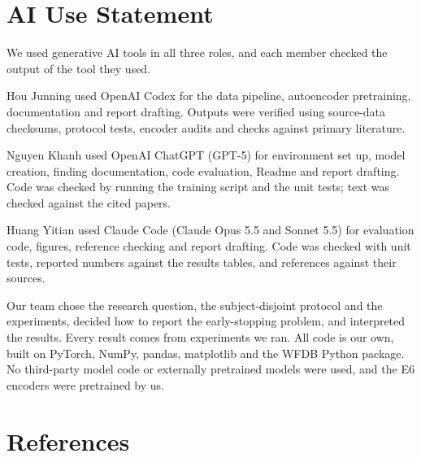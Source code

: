 \documentclass[10pt,a4paper]{article}
\begin{document}
\par\noindent\begin{minipage}{\linewidth}
\setlength{\parskip}{4pt}
\section*{AI Use Statement}

We used generative AI tools in all three roles, and each member checked the output of the tool they used.

Hou Junning used OpenAI Codex for the data pipeline, autoencoder pretraining, documentation and report drafting. Outputs were verified using source-data checksums, protocol tests, encoder audits and checks against primary literature.

Nguyen Khanh used OpenAI ChatGPT (GPT-5) for environment set up, model creation, finding documentation, code evaluation, Readme and report drafting. Code was checked by running the training script and the unit tests; text was checked against the cited papers. 

Huang Yitian used Claude Code (Claude Opus 5.5 and Sonnet 5.5) for evaluation code, figures, reference checking and report drafting. Code was checked with unit tests, reported numbers against the results tables, and references against their sources.

Our team chose the research question, the subject-disjoint protocol and the experiments, decided how to report the early-stopping problem, and interpreted the results. Every result comes from experiments we ran. All code is our own, built on PyTorch, NumPy, pandas, matplotlib and the WFDB Python package. No third-party model code or externally pretrained models were used, and the E6 encoders were pretrained by us.
\end{minipage}\par

\clearpage

\section*{References}

\printbibliography[heading=none]

\clearpage

\appendix

\renewcommand{\thefigure}{\thesection\arabic{figure}}

\renewcommand{\thetable}{\thesection\arabic{table}}

\end{document}
